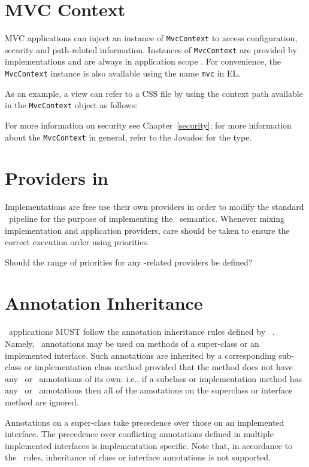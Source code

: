 \section{MVC Context}
\label{mvc_context}

MVC applications can inject an instance of {\tt MvcContext} to access configuration,
security and path-related information. Instances of {\tt MvcContext} are provided
by implementations and are always in application scope . 
For convenience, the
{\tt MvcContext} instance is also available using the name {\tt mvc} in EL.

As an example, a view can refer to a CSS file by using the context path available in 
the {\tt MvcContext} object as follows:



For more information on security see Chapter~\ref{security}; for more information 
about the {\tt MvcContext} in general, refer to the Javadoc for the type.

\section{Providers in \mvc}
\label{providers_in_mvc}

Implementations are free use their own providers in order to modify the standard 
\jaxrs\ pipeline for the purpose of implementing the \mvc\ semantics. Whenever mixing 
implementation and application providers, care should be taken to ensure the correct 
execution order using priorities.

\begin{ednote}
Should the range of priorities for any \mvc -related providers be defined?
\end{ednote}

\section{Annotation Inheritance}
\label{annotation_inheritance}

\mvc\  applications MUST follow the annotation inheritance rules defined by \jaxrs\ 
. Namely, \mvc\ annotations may be used on methods of a 
super-class or an implemented interface. Such annotations are inherited 
by a corresponding sub-class or implementation class method provided that the method does 
not have any \mvc\ or \jaxrs\ annotations of its own: 
i.e., if a subclass or implementation method has any \mvc\ or \jaxrs\ annotations then all of the
annotations on the superclass or interface method are ignored.

Annotations on a super-class take precedence over those on an implemented interface. The
precedence over conflicting annotations defined in multiple implemented interfaces is implementation 
specific. Note that, in accordance to the \jaxrs\ rules, inheritance of class or interface annotations 
is not supported. 
